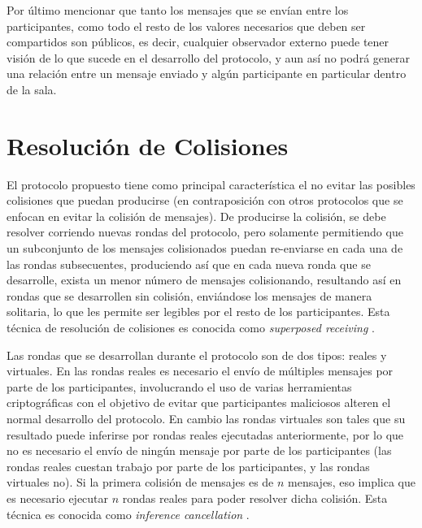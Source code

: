 Por último mencionar que tanto los mensajes que se envían entre los participantes, como todo el resto de los valores necesarios que deben ser compartidos son públicos, es decir, cualquier observador externo puede tener visión de lo que sucede en el desarrollo del protocolo, y aun así no podrá generar una relación entre un mensaje enviado y algún participante en particular dentro de la sala.

\section{Resolución de Colisiones}

El protocolo propuesto tiene como principal característica el no evitar las 
posibles colisiones que puedan producirse (en contraposición con otros 
protocolos que se enfocan en evitar la colisión de mensajes). De producirse la 
colisión, se debe resolver corriendo nuevas rondas del protocolo, pero 
solamente permitiendo que un subconjunto de los mensajes colisionados puedan 
re-enviarse en cada una de las rondas subsecuentes, produciendo así que en 
cada nueva ronda que se desarrolle, exista un menor número de mensajes 
colisionando, resultando así en rondas que se desarrollen sin colisión, 
enviándose los mensajes de manera solitaria, lo que les permite ser legibles 
por el resto de los participantes. Esta técnica de resolución de colisiones es 
conocida como \emph{superposed receiving} \cite{franck2014dining}.

Las rondas que se desarrollan durante el protocolo son de dos tipos: reales y 
virtuales. En las rondas reales es necesario el envío de múltiples mensajes 
por parte de los participantes, involucrando el uso de varias herramientas 
criptográficas con el objetivo de evitar que participantes maliciosos alteren 
el normal desarrollo del protocolo. En cambio las rondas virtuales son tales 
que su resultado puede inferirse por rondas reales ejecutadas anteriormente, 
por lo que no es necesario el envío de ningún mensaje por parte de los 
participantes (las rondas reales cuestan trabajo por parte de los 
participantes, y las rondas virtuales no). Si la primera colisión de mensajes 
es de $n$ mensajes, eso implica que es necesario ejecutar $n$ rondas reales 
para poder resolver dicha colisión. Esta técnica es conocida como 
\emph{inference cancellation} \cite{yu2005sicta}.

